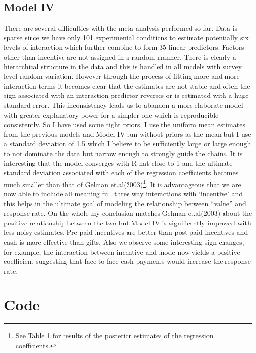 \documentclass{article}
\begin{document}
\subsection{Model IV}
There are several difficulties with the meta-analysis performed so far. Data is sparse since we have only 101 experimental conditions to estimate potentially six levels of interaction which further combine to form 35 linear predictors. Factors other than incentive are not assigned in a random manner. There is clearly a hierarchical structure in the data and this is handled in all models with survey level random variation. However through the process of fitting more and more interaction terms it becomes clear that the estimates are not stable and often the sign associated with an interaction predictor reverses or is estimated with a huge standard error. This inconsistency leads us to abandon a more elaborate model with greater explanatory power for a simpler one which is reproducible consistently. So I have used some tight priors. I use the uniform mean estimates from the previous models and Model IV run without priors as the mean but I use a standard deviation of 1.5 which I believe to be sufficiently large or large enough to not dominate the data but narrow enough to strongly guide the chains. It is interesting that the model converges with R-hat close to 1 and the ultimate standard deviation associated with each of the regression coefficients becomes much smaller than that of Gelman et.al(2003)\footnote{See Table 1 for results of the posterior estimates of the regression coefficients.}. It is advantageous that we are now able to include all meaning full three way interactions with `incentive' and this helps in the ultimate goal of modeling the relationship between ``value'' and response rate. On the whole my conclusion matches Gelman et.al(2003) about the positive relationship between the two but Model IV is significantly improved with less noisy estimates. Pre-paid incentives are better than post paid incentives and cash is more effective than gifts. Also we observe some interesting sign changes, for example, the interaction between incentive and mode now yields a positive coefficient suggesting that face to face cash payments would increase the response rate.

\section{Code}
\end{document}
